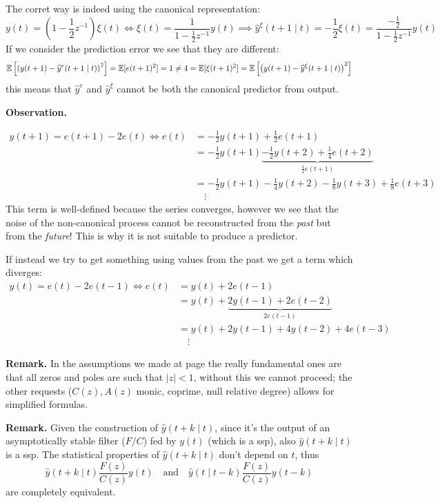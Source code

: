 The corret way is indeed using the canonical representation:
\[
	y(t) = \left( 1-\frac{1}{2} z^{-1}  \right) \xi(t) \iff \xi(t) = \frac{1}{1-\frac{1}{2} z^{-1} } y(t) \implies \boxed{\hat y^{\xi} (t+1\mid t)= -\frac{1}{2} \xi(t) = \frac{-\frac{1}{2} }{1-\frac{1}{2} z^{-1} } y(t)}
\]
If we consider the prediction error we see that they are different:
\[
	\mathbb{E}\left[ \left( y(t+1)-\widehat y^{e}(t+1\mid t)  \right) ^2   \right]  =\mathbb{E}[e(t+1)^2 ]=1\neq 4=\mathbb{E}[\xi(t+1)^2 ]=\mathbb{E}\left[ \left( y(t+1)-\widehat y ^{\xi}(t+1\mid t)  \right)^2    \right]  
\]
this means that $\hat y^{e} $ and $\hat y^{\xi} $ cannot be both the canonical predictor from output.

\textbf{Observation.}

\begin{align*}
	y(t+1)=e(t+1)-2e(t) \iff e(t)&=-\frac{1}{2} y(t+1)+\frac{1}{2} e(t+1)\\
	&= -\frac{1}{2} y(t+1)\underbrace{-\frac{1}{2} y(t+2)+\frac{1}{4}e(t+2)}_{\frac{1}{2} e(t+1)}\\
	&= -\frac{1}{2} y(t+1)-\frac{1}{4}y(t+2)-\frac{1}{8}y(t+3)+\frac{1}{8}e(t+3)\\
	&\quad\vdots
\end{align*}
This term is well-defined because the series converges, however we see that the noise of the non-canonical process cannot be reconstructed from the \emph{past} but from the \emph{future}! This is why it is not suitable to produce a predictor.

If instead we try to get something using values from the past we get a term which diverges:
\begin{align*}
	y(t)=e(t)-2e(t-1) \iff e(t)&=y(t)+2e(t-1)\\
	&=y(t)+\underbrace{2y(t-1)+2e(t-2)}_{2e(t-1)}\\
	&=y(t)+2y(t-1)+4y(t-2)+4e(t-3)\\
	&\quad\vdots
\end{align*}

\textbf{Remark.}
In the assumptions we made at page \pageref{assumptions-prediction-theory} the really fundamental ones are that all zeros and poles are such that $|z|<1$, without this we cannot proceed; the other requests ($C(z),A(z)$ monic, coprime, null relative degree) allows for simplified formulas.

\textbf{Remark.}
Given the construction of $\hat y(t+k\mid t)$, since it's the output of an asymptotically stable filter ($F/C$) fed by $y(t)$ (which is a \gls{ssp}), also $\hat y(t+k\mid t)$ is a \gls{ssp}. The statistical properties of $\hat y(t+k\mid t)$ don't depend on $t$, thus
\[
	\hat y(t+k\mid t)\frac{F(z)}{C(z)}y(t) \quad \text{and} \quad \hat y(t\mid t-k)\frac{F(z)}{C(z)}y(t-k)
\]
are completely equivalent.

